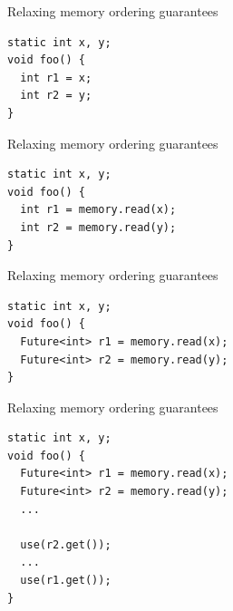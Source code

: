 \begin{frame}[t,fragile]{Relaxing memory ordering guarantees}

\begin{verbatim}
static int x, y;
void foo() {
  int r1 = x;
  int r2 = y;
}
\end{verbatim}

\end{frame}


\begin{frame}{Relaxing memory ordering guarantees}

\begin{verbatim}
static int x, y;
void foo() {
  int r1 = memory.read(x);
  int r2 = memory.read(y);
}
\end{verbatim}

\pause


\end{frame}


\begin{frame}{Relaxing memory ordering guarantees}

\begin{verbatim}
static int x, y;
void foo() {
  Future<int> r1 = memory.read(x);
  Future<int> r2 = memory.read(y);
}
\end{verbatim}

\end{frame}


\begin{frame}{Relaxing memory ordering guarantees}

\begin{verbatim}
static int x, y;
void foo() {
  Future<int> r1 = memory.read(x);
  Future<int> r2 = memory.read(y);
  ...

  use(r2.get());
  ...
  use(r1.get());
}
\end{verbatim}

\pause


\end{frame}


